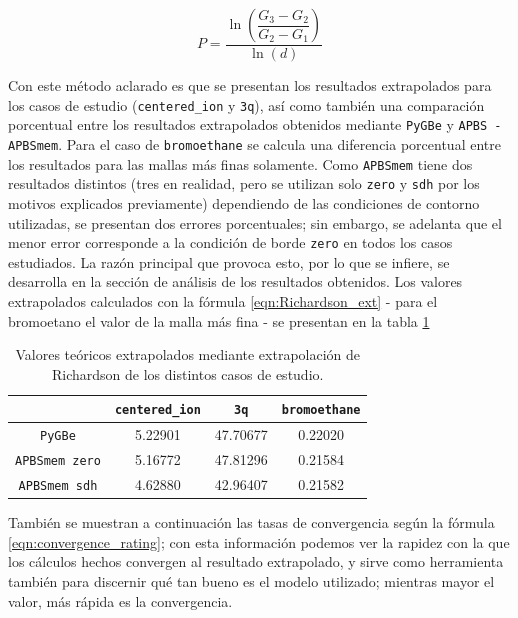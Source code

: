 \documentclass[12pt, twoside, onehalfspace, numbers, spanish]{ezthesis}
\numberwithin{equation}{section}
\begin{document}
\begin{equation}\label{eqn:convergence_rating}
	P = \dfrac{\ln{\left(\dfrac{G_3 - G_2}{G_2 - G_1}\right)}}{\ln{(d)}}
\end{equation}

\noindent
Con este método aclarado es que se presentan los resultados extrapolados para los casos de estudio (\texttt{centered\_ion} y \texttt{3q}), así como también una comparación porcentual entre los resultados extrapolados obtenidos mediante \texttt{PyGBe} y \texttt{APBS - APBSmem}. Para el caso de \texttt{bromoethane} se calcula una diferencia porcentual entre los resultados para las mallas más finas solamente. Como \texttt{APBSmem} tiene dos resultados distintos (tres en realidad, pero se utilizan solo \texttt{zero} y \texttt{sdh} por los motivos explicados previamente) dependiendo de las condiciones de contorno utilizadas, se presentan dos errores porcentuales; sin embargo, se adelanta que el menor error corresponde a la condición de borde \texttt{zero} en todos los casos estudiados. La razón principal que provoca esto, por lo que se infiere, se desarrolla en la sección de análisis de los resultados obtenidos. Los valores extrapolados calculados con la fórmula \ref{eqn:Richardson_ext} - para el bromoetano el valor de la malla más fina - se presentan en la tabla \ref{table:Rich_extrapolation}

\begin{table}[h]
	\centering
	\caption{Valores teóricos extrapolados mediante extrapolación de Richardson de los distintos casos de estudio.}
	\def\arraystretch{1.2}
	\begin{tabular}{|c|ccc|}\hline
		 & \texttt{centered\_ion} & \texttt{3q} & \texttt{bromoethane} \\ \hline
		\texttt{PyGBe} & 5.22901 & 47.70677 & 0.22020 \\ \hline
		\texttt{APBSmem zero} & 5.16772 & 47.81296 & 0.21584 \\ \hline
		\texttt{APBSmem sdh} & 4.62880 & 42.96407 & 0.21582 \\ \hline
	\end{tabular}\label{table:Rich_extrapolation}
\end{table}

\noindent
También se muestran a continuación las tasas de convergencia según la fórmula \ref{eqn:convergence_rating}; con esta información podemos ver la rapidez con la que los cálculos hechos convergen al resultado extrapolado, y sirve como herramienta también para discernir qué tan bueno es el modelo utilizado; mientras mayor el valor, más rápida es la convergencia.
\end{document}
